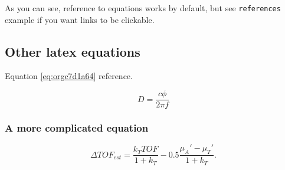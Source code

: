 As you can see, reference to equations works by default, but see \texttt{references}
example if you want links to be clickable.

\subsection{Other latex equations}
\label{sec:orgb443545}
Equation \ref{eq:orgc7d1a64} reference.

\begin{equation}
\label{eq:orgc7d1a64}
D = \frac{c\phi}{2\pi f}
\end{equation}

\subsubsection{A more complicated equation}
\label{sec:org306f345}

\begin{equation}
\Delta TOF_{est} = \frac{k_T TOF}{1+k_T } - 0.5 \frac{\mu_A' - \mu_T'}{1+k_T}.
\end{equation}


